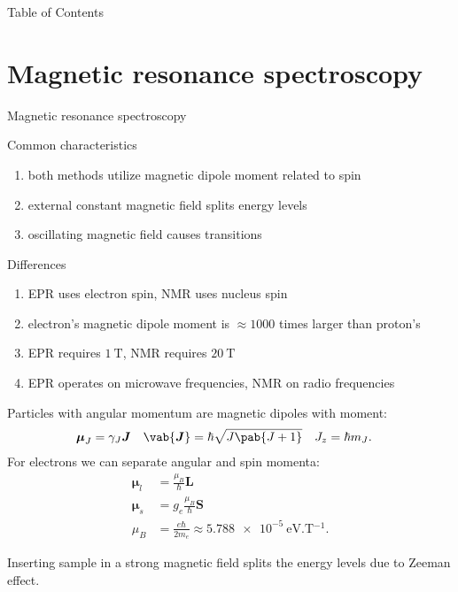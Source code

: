 \documentclass[xcolor]{beamer}
\title{}
\author{Rafał Staroszczyk}
\date{Electron Paramagnetic Resonance \\ and \\ Nuclear Magnetic Resonance}
\newcommand\vb[1]{\boldsymbol{#1}}
\begin{document}
\maketitle
\begin{frame}{Table of Contents}
\tableofcontents
\end{frame}

\section{Magnetic resonance spectroscopy}
\begin{frame}{Magnetic resonance spectroscopy}
\begin{block}{Common characteristics}
	\begin{enumerate}
		\item both methods utilize magnetic dipole moment related to spin
		\item external constant magnetic field splits energy levels
		\item oscillating magnetic field causes transitions
	\end{enumerate}
\end{block}

\begin{block}{Differences}
	\begin{enumerate}
		\item EPR uses electron spin, NMR uses nucleus spin
		\item electron's magnetic dipole moment is $\approx 1000$ times larger than proton's
		\item EPR requires $\qty{1}{\tesla}$, NMR requires $\qty{20}{\tesla}$
		\item EPR operates on microwave frequencies, NMR on radio frequencies
	\end{enumerate}
\end{block}
\end{frame}

\begin{frame}
	Particles with angular momentum are magnetic dipoles with moment:
	\begin{align*}
		\vb{\mu}_{J} &= \gamma_{J} \vb{J} & \vab{\vb{J}} &= \hbar\sqrt{J\pab{J+1}} & J_{z} &= \hbar m_{J}.
	\end{align*}
	For electrons we can separate angular and spin momenta:
	\begin{align*}
		\vb{\mu}_{l} &= \frac{\mu_B}{\hbar} \vb{L} \\
		\vb{\mu}_{s} &= g_e\frac{\mu_B}{\hbar} \vb{S} \\
		\mu_B &= \frac{e\hbar}{2 m_e} \approx \qty{5.788e-5}{\eV.\tesla^{-1}}.
	\end{align*}
	
	
	
	
	Inserting sample in a strong magnetic field splits the energy levels due to Zeeman effect.
\end{frame}
\end{document}
